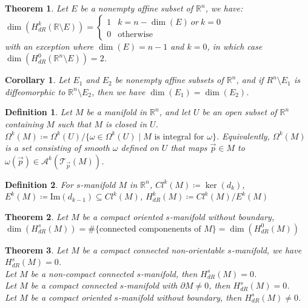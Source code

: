 \documentclass[9pt]{article}
\theoremstyle{break}
\theoremstyle{break}
\newtheorem{thm}{Theorem}[section]
\newtheorem{corT}[lem]{Corollary}
\newtheorem{defn}{Definition}[corL]
\newcommand{\R}{\mathbb{R}}
\newcommand{\T}{\mathcal{T}}
\newcommand{\A}{\mathcal{A}}
\begin{document}
\begin{thm}
Let $E$ be a nonempty affine subset of $\R^n$, we have: $\dim(H^k_{dR}(\R \setminus E)) = \begin{cases} 1 & k=n-\dim(E) \ or\ k=0 \\ 0 &\text{otherwise}\end{cases}$\\
with an exception where $\dim(E) = n-1$ and $k=0$, in which case $\dim(H_{dR}^0 (\R^n \setminus E)) = 2$.
\end{thm}

\begin{corT}
Let $E_1$ and $E_2$ be nonempty affine subsets of $\R^n$, and if $R^n \setminus E_1$ is diffeomorphic to $\R^n \setminus E_2$, then we have $\dim(E_1) = \dim(E_2)$. 
\end{corT}

\begin{defn}
Let $M$ be a manifold in $\R^n$, and let $U$ be an open subset of $\R^n$ containing $M$ such that $M$ is closed in $U$. $\Omega^k(M) \coloneqq \Omega^k(U) /\{ \omega \in \Omega^k(U) \mid M \text{ is integral for }\omega\}$. Equivalently, $\Omega^k(M)$ is a set consisting of smooth $\omega$ defined on $U$ that maps $\vec{p}\in M$ to $\omega(\vec{p}) \in \A^k(\T_{\vec{p}}(M))$.
\end{defn}


\begin{defn}
For $s$-manifold $M$ in $\R^n$, $Cl^k(M) \coloneqq \ker(d_k)$,
$E^k(M) \coloneqq \text{Im}(d_{k-1}) \subseteq Cl^k(M)$, 
$H^k_{dR}(M) \coloneqq Cl^k(M) / E^k(M)$
\end{defn}


\begin{thm}
Let $M$ be a compact oriented $s$-manifold without boundary, $
\dim(H_{dR}^s (M) )= \#\{\text{connected componenents of }M\} = \dim(H_{dR}^0 (M))$
\end{thm}


\begin{thm}
Let $M$ be a compact connected non-orientable $s$-manifold, we have $H_{dR}^s(M) = 0$.\\
Let $M$ be a non-compact connected $s$-manifold, then $H_{dR}^s(M) = 0$.\\
Let $M$ be a compact connected $s$-manifold with $\partial M\neq 0$, then $H_{dR}^s(M) = 0$.\\
Let $M$ be a compact oriented $s$-manifold without boundary, then $H_{dR}^s(M) \neq 0$. 
\end{thm}
\end{document}
